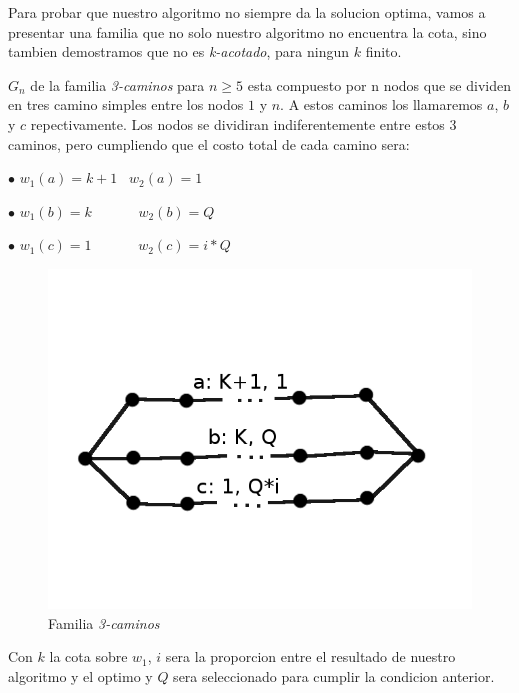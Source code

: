 Para probar que nuestro algoritmo no siempre da la solucion optima, vamos a presentar una familia que no solo nuestro algoritmo no encuentra la cota, sino tambien demostramos que no es \emph{k-acotado}, para ningun $k$ finito.


$G_n$ de la familia \emph{3-caminos} para $n \geq 5$ esta compuesto por n nodos que se dividen en tres camino simples entre los nodos $1$ y $n$. A estos caminos los llamaremos $a$, $b$ y $c$ repectivamente. Los nodos se dividiran indiferentemente entre estos 3 caminos, pero cumpliendo que el costo total de cada camino sera:

$\bullet$ $w_1(a) = k+1$ \ $w_2(a)=1$

$\bullet$ $w_1(b) = k$  \ \ \ \ \ \ $w_2(b)=Q$

$\bullet$ $w_1(c) = 1$ \ \ \ \ \ \   $w_2(c)=i*Q$


\begin{figure}[H]
  \begin{center}
  \begin{minipage}{0.5\linewidth}
    \includegraphics[width=\linewidth]{graficos/grafoFamiliaRompe.png}
    \caption{Familia \emph{3-caminos}}\label{fig:familia1}
  \end{minipage}
  \end{center}
\end{figure}

Con $k$ la cota sobre $w_1$, $i$ sera la proporcion entre el resultado de nuestro algoritmo y el optimo y $Q$ sera seleccionado para cumplir la condicion anterior.

